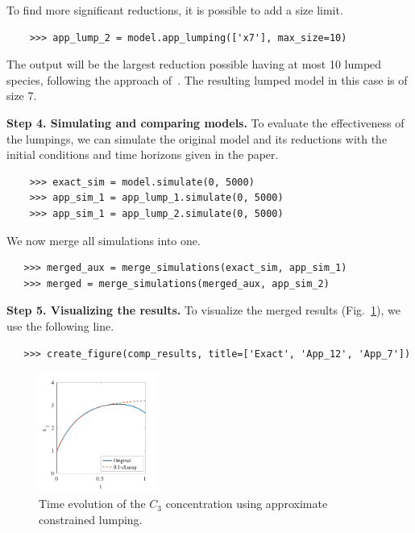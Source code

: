 To find more significant reductions, it is possible to add a size limit. 
\begin{verbatim}
    >>> app_lump_2 = model.app_lumping(['x7'], max_size=10)
\end{verbatim}
The output will be the largest reduction possible having at most 10 lumped species, following the approach of~\cite{leguizamon-robayo_approximate_2023}.
The resulting lumped model in this case is of size 7.

\textbf{Step 4. Simulating and comparing models.}
To evaluate the effectiveness of the lumpings, we can simulate the original model and its reductions with the initial conditions and time horizons given in the paper. 
\begin{verbatim}
    >>> exact_sim = model.simulate(0, 5000)
    >>> app_sim_1 = app_lump_1.simulate(0, 5000)
    >>> app_sim_1 = app_lump_2.simulate(0, 5000)
\end{verbatim}
We now merge all simulations into one. 
\begin{verbatim}
   >>> merged_aux = merge_simulations(exact_sim, app_sim_1) 
   >>> merged = merge_simulations(merged_aux, app_sim_2) 
\end{verbatim}
\textbf{Step 5. Visualizing the results.}
To visualize the merged results (Fig.~\ref{fig:results}), we use the following line.
\begin{verbatim}
   >>> create_figure(comp_results, title=['Exact', 'App_12', 'App_7']) 
\end{verbatim}

\begin{figure}
    \centering
    \vspace{-2cm}
    \includegraphics[width=0.35\textwidth]{img/examplecalc.pdf}
    \caption{
        Time evolution of the $C_3$ concentration using approximate constrained lumping.}
    \label{fig:results}
\end{figure}



